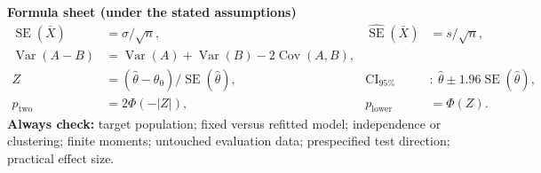 \documentclass[11pt,letterpaper]{article}
\newcommand{\Var}{\operatorname{Var}}
\newcommand{\Cov}{\operatorname{Cov}}
\newcommand{\SE}{\operatorname{SE}}
\theoremstyle{definition}
\theoremstyle{remark}
\numberwithin{equation}{section}
\begin{document}
\textbf{Formula sheet (under the stated assumptions)}
\begin{align*}
\SE(\bar X)&=\sigma/\sqrt n,
&\widehat{\SE}(\bar X)&=s/\sqrt n,\\
\Var(A-B)&=\Var(A)+\Var(B)-2\Cov(A,B),\\
Z&=(\widehat\theta-\theta_0)/\SE(\widehat\theta),
&\mathrm{CI}_{95\%}&:\ \widehat\theta\pm1.96\SE(\widehat\theta),\\
p_{\mathrm{two}}&=2\Phi(-|Z|),
&p_{\mathrm{lower}}&=\Phi(Z).
\end{align*}
\textbf{Always check:} target population; fixed versus refitted model; independence
or clustering; finite moments; untouched evaluation data; prespecified test
direction; practical effect size.
\end{document}
